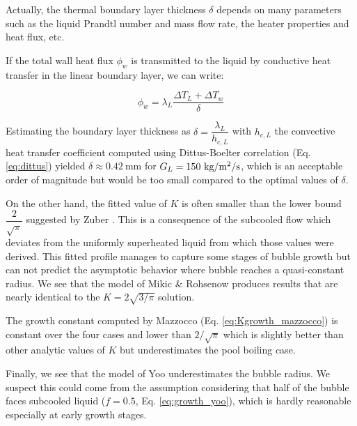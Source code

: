 \begin{remark*}{}
Actually, the thermal boundary layer thickness $\delta$ depends on many parameters such as the liquid Prandtl number and mass flow rate, the heater properties and heat flux, etc.

\npar

If the total wall heat flux $\phi_{w}$ is transmitted to the liquid by conductive heat transfer in the linear boundary layer, we can write:

\begin{equation}
\phi_{w} = \lambda_{L} \dfrac{\Delta T_{L} + \Delta T_{w}}{\delta}
\end{equation} 

\npar

Estimating the boundary layer thickness as $ \delta = \dfrac{\lambda_{L}}{h_{c,L}}$ with $h_{c,L}$ the convective heat transfer coefficient computed using Dittus-Boelter correlation (Eq. \ref{eq:dittus}) yielded $\delta \approx 0.42~$mm for $G_{L}=150~\text{kg/m$^{2}$/s}$, which is an acceptable order of magnitude but would be too small compared to the optimal values of $\delta$.

\end{remark*}

\npar

On the other hand, the fitted value of $K$ is often smaller than the lower bound $\dfrac{2}{\sqrt{\pi}}$ suggested by Zuber \cite{zuber_dynamics_1961}. This is a consequence of the subcooled flow which deviates from the uniformly superheated liquid from which those values were derived. This fitted profile manages to capture some stages of bubble growth but can not predict the asymptotic behavior where bubble reaches a quasi-constant radius. We see that the model of Mikic \& Rohsenow produces results that are nearly identical to the $K=2\sqrt{3/\pi}$ solution.


The growth constant computed by Mazzocco \etal (Eq. \ref{eq:Kgrowth_mazzocco}) is constant over the four cases and lower than $2/\sqrt{\pi}$ which is slightly better than other analytic values of $K$ but underestimates the pool boiling case.


\npar

Finally, we see that the model of Yoo \etal underestimates the bubble radius. We suspect this could come from the assumption considering that half of the bubble faces subcooled liquid ($f=0.5$, Eq. \ref{eq:growth_yoo}), which is hardly reasonable especially at early growth stages.

\npar

